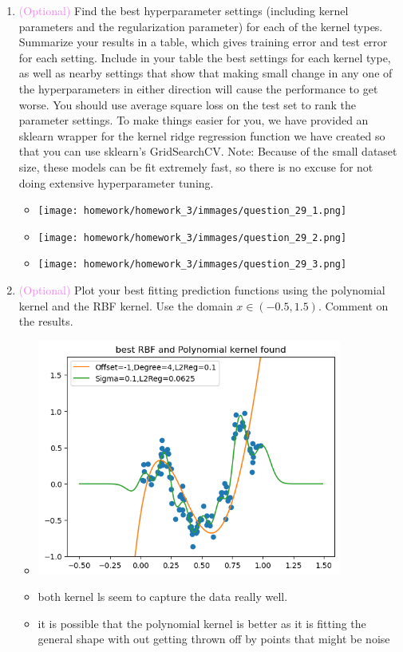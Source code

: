 \documentclass{article}
\theoremstyle{plain}
\theoremstyle{definition}
\begin{document}
\begin{enumerate}
\item \textcolor{violet}{(Optional)} Find the best hyperparameter settings (including kernel parameters
and the regularization parameter) for each of the kernel types. Summarize
your results in a table, which gives training error and test error
for each setting. Include in your table the best settings for each
kernel type, as well as nearby settings that show that making small
change in any one of the hyperparameters in either direction will
cause the performance to get worse. You should use average square
loss on the test set to rank the parameter settings. To make things
easier for you, we have provided an sklearn wrapper for the kernel
ridge regression function we have created so that you can use sklearn's
GridSearchCV. Note: Because of the small dataset size, these models
can be fit extremely fast, so there is no excuse for not doing extensive
hyperparameter tuning. 
\begin{itemize}
    \color{blue}
    \item \texttt{[image: homework/homework\_3/immages/question\_29\_1.png]}
    \item \texttt{[image: homework/homework\_3/immages/question\_29\_2.png]}
    \item \texttt{[image: homework/homework\_3/immages/question\_29\_3.png]}
\end{itemize}

\item \textcolor{violet}{(Optional)} Plot your best fitting prediction functions using the polynomial kernel
and the RBF kernel. Use the domain $x\in\left(-0.5,1.5\right)$. Comment
on the results. 
\begin{itemize}
    \color{blue}
    \item \includegraphics[width=10cm]{homework/homework_3/immages/question_30_1.png}
    \item both kernel ls seem to capture the data really well. 
    \item it is possible that the polynomial kernel is better as it is fitting the general shape with out getting thrown off by points that might be noise


\end{itemize}
\end{enumerate}
\end{document}
